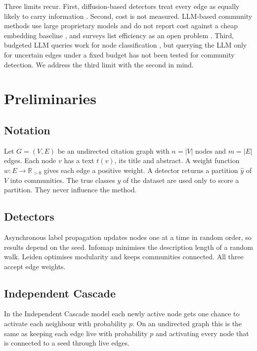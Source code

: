 \documentclass[journal]{IEEEtran}
\begin{document}
Three limits recur. First, diffusion-based detectors treat every edge as equally likely to carry information \cite{raghavan2007,rosvall2008,meena2024,das2026}. Second, cost is not measured. LLM-based community methods use large proprietary models and do not report cost against a cheap embedding baseline \cite{ni2026,gujral2025}, and surveys list efficiency as an open problem \cite{jin2024,li2024}. Third, budgeted LLM queries work for node classification \cite{chen2024llmgnn}, but querying the LLM only for uncertain edges under a fixed budget has not been tested for community detection. We address the third limit with the second in mind.

\section{Preliminaries}
\label{sec:prelim}
\subsection{Notation}
Let $G=(V,E)$ be an undirected citation graph with $n=|V|$ nodes and $m=|E|$ edges. Each node $v$ has a text $t(v)$, its title and abstract. A weight function $w:E\to\mathbb{R}_{>0}$ gives each edge a positive weight. A detector returns a partition $\hat{y}$ of $V$ into communities. The true classes $y$ of the dataset are used only to score a partition. They never influence the method.

\subsection{Detectors}
Asynchronous label propagation \cite{raghavan2007} updates nodes one at a time in random order, so results depend on the seed. Infomap \cite{rosvall2008} minimises the description length of a random walk. Leiden \cite{traag2019} optimises modularity and keeps communities connected. All three accept edge weights.

\subsection{Independent Cascade}
In the Independent Cascade model \cite{kempe2003} each newly active node gets one chance to activate each neighbour with probability $p$. On an undirected graph this is the same as keeping each edge live with probability $p$ and activating every node that is connected to a seed through live edges.
\end{document}
